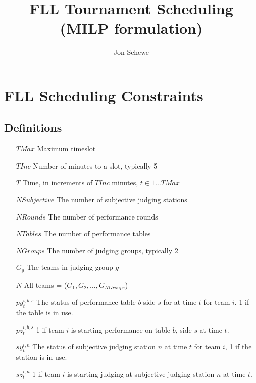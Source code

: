 \documentclass[letterpaper,11pt]{report}
\title{FLL Tournament Scheduling (MILP formulation)}
\author{Jon Schewe}
\begin{document}
\maketitle

\chapter{FLL Scheduling Constraints}

\section{Definitions}
\begin{itemize}

\item[$TMax$] Maximum timeslot
\item[$TInc$] Number of minutes to a slot, typically 5
\item[$T$] Time, in increments of $TInc$ minutes, $t \in 1 \dots TMax$
\item[$NSubjective$] The number of subjective judging stations
\item[$NRounds$] The number of performance rounds
\item[$NTables$] The number of performance tables
\item[$NGroups$] The number of judging groups, typically 2

\item[$G_{g}$] The teams in judging group $g$
\item[$N$] All teams = ($G_{1}, G_{2}, \dots, G_{NGroups}$)

\item[$py_{t}^{i,b,s}$] The status of performance table $b$ side $s$ for
at  time $t$ for team $i$. 1 if the table is in use.  

\item[$pz_{t}^{i,b,s}$] 1 if team $i$ is starting performance on table $b$,
  side $s$ at time $t$.

\item[$sy_{t}^{i,n}$] The status of subjective judging station $n$ at time $t$ for team
  $i$, 1 if the station is in use.

\item[$sz_{t}^{i,n}$] 1 if team $i$ is starting judging at subjective
judging station $n$ at time $t$.


\end{itemize}
\end{document}
